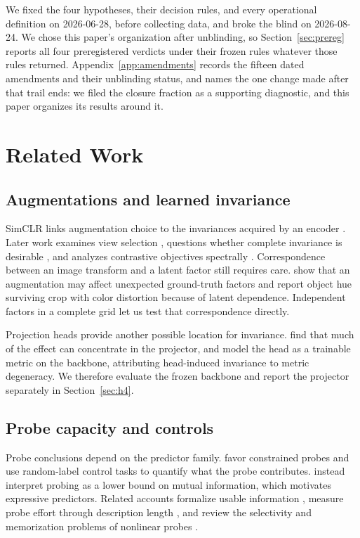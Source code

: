\documentclass[10pt]{article}
\begin{document}
We fixed the four hypotheses, their decision rules, and every operational definition on 2026-06-28,
before collecting data, and broke the blind on 2026-08-24. We chose this paper's organization after unblinding, so
Section~\ref{sec:prereg} reports all four preregistered verdicts under their frozen rules whatever
those rules returned. Appendix~\ref{app:amendments} records the fifteen dated amendments and their
unblinding status, and names the one change made after that trail ends: we filed the closure
fraction as a supporting diagnostic, and this paper organizes its results around it.

\section{Related Work}
\label{sec:related}

\subsection{Augmentations and learned invariance}
SimCLR links augmentation choice to the invariances acquired by an encoder
\citep{chen2020simple}. Later work examines view selection \citep{tian2020makes}, questions whether
complete invariance is desirable \citep{tamkin2022feature}, and analyzes contrastive objectives
spectrally \citep{haochen2021provable,balestriero2022contrastive}. Correspondence between an image
transform and a latent factor still requires care. \citet{vonkugelgen2021self} show that an
augmentation may affect unexpected ground-truth factors and report object hue surviving crop with
color distortion because of latent dependence. Independent factors in a complete grid let us test
that correspondence directly.

Projection heads provide another possible location for invariance. \citet{cosentino2022geometry}
find that much of the effect can concentrate in the projector, and \citet{chaudhry2026geometry}
model the head as a trainable metric on the backbone, attributing head-induced invariance to metric
degeneracy. We therefore evaluate the frozen backbone and report the projector separately in
Section~\ref{sec:h4}.

\subsection{Probe capacity and controls}
Probe conclusions depend on the predictor family. \citet{hewitt2019designing} favor constrained
probes and use random-label control tasks to quantify what the probe contributes.
\citet{pimentel2020information} instead interpret probing as a lower bound on mutual information,
which motivates expressive predictors. Related accounts formalize usable information
\citep{xu2020theory}, measure probe effort through description length \citep{voita2020information},
and review the selectivity and memorization problems of nonlinear probes
\citep{belinkov2022probing}.
\end{document}
